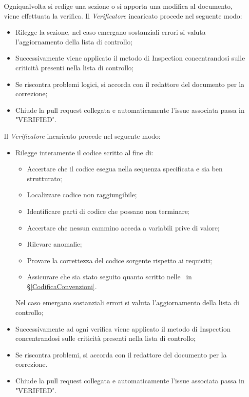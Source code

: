 \label{VerificaDocumentazione}Ogniqualvolta si redige una sezione o si apporta una modifica al documento, viene effettuata la verifica. Il \textit{Verificatore} incaricato procede nel seguente modo:
\begin{itemize}
	\item Rilegge la sezione, nel caso emergano sostanziali errori si valuta l'aggiornamento della lista di controllo;
	\item Successivamente viene applicato il metodo di Inspection concentrandosi sulle criticità presenti nella lista di controllo;
	\item Se riscontra problemi logici, si accorda con il redattore del documento per la correzione;
	\item Chiude la pull request collegata e automaticamente l'issue associata passa in "VERIFIED".
\end{itemize}

\label{VerificaCodice}Il \textit{Verificatore} incaricato procede nel seguente modo:
\begin{itemize}
	\item Rilegge interamente il codice scritto al fine di:
	\begin{itemize}
		\item Accertare che il codice esegua nella sequenza specificata e sia ben strutturato;
		\item Localizzare codice non raggiungibile;
		\item Identificare parti di codice che possano non terminare;
		\item Accertare che nessun cammino acceda a variabili prive di valore;
		\item Rilevare anomalie;
		\item Provare la correttezza del codice sorgente rispetto ai requisiti;
		\item Assicurare che sia stato seguito quanto scritto nelle \NdPv\ in \S\ref{CodificaConvenzioni}.
	\end{itemize}
	Nel caso emergano sostanziali errori si valuta l'aggiornamento della lista di controllo;
	\item Successivamente ad ogni verifica viene applicato il metodo di Inspection concentrandosi sulle criticità presenti nella lista di controllo;
	\item Se riscontra problemi, si accorda con il redattore del documento per la correzione. 
	\item Chiude la pull request collegata e automaticamente l'issue associata passa in "VERIFIED".
\end{itemize}

